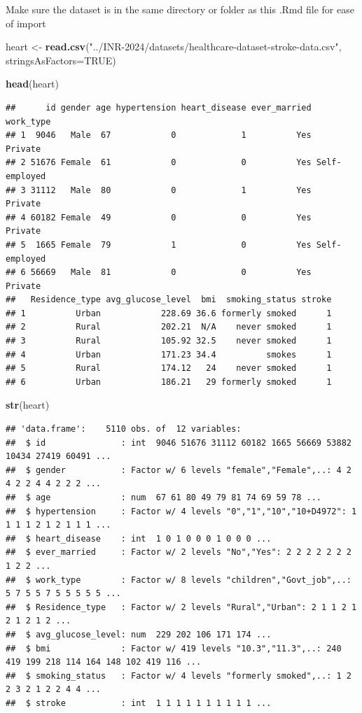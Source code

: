 \documentclass[
]{book}
\newenvironment{Shaded}{\begin{snugshade}}{\end{snugshade}}
\newcommand{\AttributeTok}[1]{\textcolor[rgb]{0.13,0.29,0.53}{#1}}
\newcommand{\ConstantTok}[1]{\textcolor[rgb]{0.56,0.35,0.01}{#1}}
\newcommand{\FunctionTok}[1]{\textcolor[rgb]{0.13,0.29,0.53}{\textbf{#1}}}
\newcommand{\NormalTok}[1]{#1}
\newcommand{\OtherTok}[1]{\textcolor[rgb]{0.56,0.35,0.01}{#1}}
\newcommand{\StringTok}[1]{\textcolor[rgb]{0.31,0.60,0.02}{#1}}
\begin{document}
Make sure the dataset is in the same directory or folder as this .Rmd file for ease of import

\begin{Shaded}
\begin{Highlighting}[]
\NormalTok{heart }\OtherTok{\textless{}{-}} \FunctionTok{read.csv}\NormalTok{(}\StringTok{"../INR{-}2024/datasets/healthcare{-}dataset{-}stroke{-}data.csv"}\NormalTok{, }\AttributeTok{stringsAsFactors=}\ConstantTok{TRUE}\NormalTok{)}

\FunctionTok{head}\NormalTok{(heart)}
\end{Highlighting}
\end{Shaded}

\begin{verbatim}
##      id gender age hypertension heart_disease ever_married     work_type
## 1  9046   Male  67            0             1          Yes       Private
## 2 51676 Female  61            0             0          Yes Self-employed
## 3 31112   Male  80            0             1          Yes       Private
## 4 60182 Female  49            0             0          Yes       Private
## 5  1665 Female  79            1             0          Yes Self-employed
## 6 56669   Male  81            0             0          Yes       Private
##   Residence_type avg_glucose_level  bmi  smoking_status stroke
## 1          Urban            228.69 36.6 formerly smoked      1
## 2          Rural            202.21  N/A    never smoked      1
## 3          Rural            105.92 32.5    never smoked      1
## 4          Urban            171.23 34.4          smokes      1
## 5          Rural            174.12   24    never smoked      1
## 6          Urban            186.21   29 formerly smoked      1
\end{verbatim}

\begin{Shaded}
\begin{Highlighting}[]
\FunctionTok{str}\NormalTok{(heart)}
\end{Highlighting}
\end{Shaded}

\begin{verbatim}
## 'data.frame':    5110 obs. of  12 variables:
##  $ id               : int  9046 51676 31112 60182 1665 56669 53882 10434 27419 60491 ...
##  $ gender           : Factor w/ 6 levels "female","Female",..: 4 2 4 2 2 4 4 2 2 2 ...
##  $ age              : num  67 61 80 49 79 81 74 69 59 78 ...
##  $ hypertension     : Factor w/ 4 levels "0","1","10","10+D4972": 1 1 1 1 2 1 2 1 1 1 ...
##  $ heart_disease    : int  1 0 1 0 0 0 1 0 0 0 ...
##  $ ever_married     : Factor w/ 2 levels "No","Yes": 2 2 2 2 2 2 2 1 2 2 ...
##  $ work_type        : Factor w/ 8 levels "children","Govt_job",..: 5 7 5 5 7 5 5 5 5 5 ...
##  $ Residence_type   : Factor w/ 2 levels "Rural","Urban": 2 1 1 2 1 2 1 2 1 2 ...
##  $ avg_glucose_level: num  229 202 106 171 174 ...
##  $ bmi              : Factor w/ 419 levels "10.3","11.3",..: 240 419 199 218 114 164 148 102 419 116 ...
##  $ smoking_status   : Factor w/ 4 levels "formerly smoked",..: 1 2 2 3 2 1 2 2 4 4 ...
##  $ stroke           : int  1 1 1 1 1 1 1 1 1 1 ...
\end{verbatim}
\end{document}
